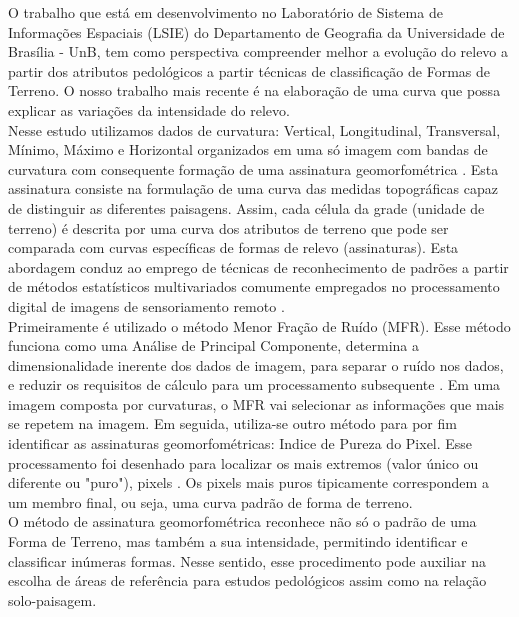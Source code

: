 O trabalho que está em desenvolvimento no Laboratório de Sistema de Informações Espaciais (LSIE) do Departamento de Geografia da Universidade de Brasília - UnB, tem como perspectiva compreender melhor a evolução do relevo a partir dos atributos pedológicos a partir técnicas de classificação de Formas de Terreno. O nosso trabalho mais recente é na elaboração de uma curva que possa explicar as variações da intensidade do relevo.\\
Nesse estudo utilizamos dados de curvatura: Vertical, Longitudinal, Transversal, Mínimo, Máximo e Horizontal organizados em uma só imagem com bandas de curvatura com consequente formação de uma  assinatura geomorfométrica \citep{Vasconcelos:2012}. Esta assinatura consiste na formulação de uma curva das medidas topográficas capaz de distinguir as diferentes paisagens. Assim, cada célula da grade (unidade de terreno) é descrita por uma curva dos atributos de terreno que pode ser comparada com curvas específicas de formas de relevo (assinaturas). Esta abordagem conduz ao emprego de técnicas de reconhecimento de padrões a partir de métodos estatísticos multivariados comumente empregados no processamento digital de imagens de sensoriamento remoto \citep{BrownEtAl:1998}.\\
Primeiramente é utilizado o método Menor Fração de Ruído (MFR). Esse método funciona como uma Análise de Principal Componente, determina a dimensionalidade inerente dos dados de imagem, para separar o ruído nos dados, e reduzir os requisitos de cálculo para um processamento subsequente \citep{BoardmanEtAl:1994}. Em uma imagem composta por curvaturas, o MFR vai selecionar as informações que mais se repetem na imagem. Em seguida, utiliza-se outro método para por fim identificar as assinaturas geomorfométricas: Indice de Pureza do Pixel. Esse processamento foi desenhado para localizar os mais extremos (valor único ou diferente ou "puro"), pixels \citep{BoardmanEtAl:1995}. Os pixels mais puros tipicamente correspondem a um membro final, ou seja, uma curva padrão de forma de terreno.\\
O método de assinatura geomorfométrica reconhece não só o padrão de uma Forma de Terreno, mas também a sua intensidade, permitindo identificar e classificar inúmeras formas. Nesse sentido, esse procedimento pode auxiliar na escolha de áreas de referência para estudos pedológicos assim como na relação solo-paisagem.
